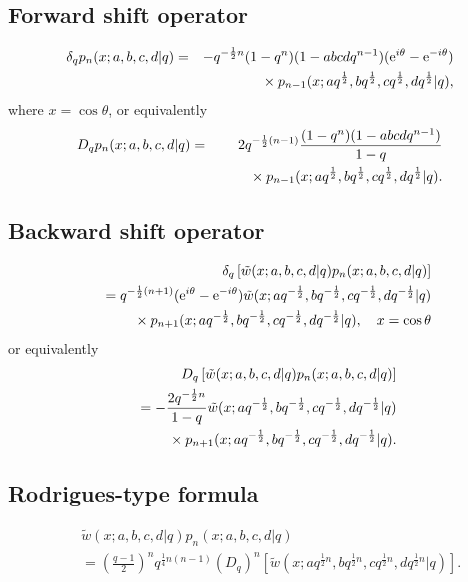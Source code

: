 \documentclass[envcountchap,graybox]{svmono}
\newcommand{\mathindent}{\hspace{7.5mm}}
\newcommand{\e}{\textrm{e}}
\begin{document}
\subsection*{Forward shift operator}
\begin{eqnarray}
\label{shift1AskeyWilsonI}
\delta_q p_n(x;a,b,c,d|q)&=&-q^{-\frac{1}{2}n}(1-q^n)(1-abcdq^{n-1})(\e^{i\theta}-\e^{-i\theta})\nonumber\\
& &{}\mathindent{}\times p_{n-1}(x;aq^{\frac{1}{2}},bq^{\frac{1}{2}},cq^{\frac{1}{2}},dq^{\frac{1}{2}}|q),
\end{eqnarray}
where $x=\cos\theta$, or equivalently
\begin{eqnarray}
\label{shift1AskeyWilsonII}
D_q p_n(x;a,b,c,d|q)&=&2q^{-\frac{1}{2}(n-1)}\frac{(1-q^n)(1-abcdq^{n-1})}{1-q}\nonumber\\
& &{}\mathindent\times p_{n-1}(x;aq^{\frac{1}{2}},bq^{\frac{1}{2}},cq^{\frac{1}{2}},dq^{\frac{1}{2}}|q).
\end{eqnarray}

\subsection*{Backward shift operator}
\begin{eqnarray}
\label{shift2AskeyWilsonI}
& &\delta_q\left[{\tilde w}(x;a,b,c,d|q)p_n(x;a,b,c,d|q)\right]\nonumber\\
& &{}=q^{-\frac{1}{2}(n+1)}(\e^{i\theta}-\e^{-i\theta}){\tilde w}(x;aq^{-\frac{1}{2}},bq^{-\frac{1}{2}},cq^{-\frac{1}{2}},dq^{-\frac{1}{2}}|q)\nonumber\\
& &{}\mathindent{}\times p_{n+1}(x;aq^{-\frac{1}{2}},bq^{-\frac{1}{2}},cq^{-\frac{1}{2}},dq^{-\frac{1}{2}}|q),
\quad x=\cos\theta
\end{eqnarray}
or equivalently
\begin{eqnarray}
\label{shift2AskeyWilsonII}
& &D_q\left[{\tilde w}(x;a,b,c,d|q)p_n(x;a,b,c,d|q)\right]\nonumber\\
& &{}=-\frac{2q^{-\frac{1}{2}n}}{1-q}{\tilde w}(x;aq^{-\frac{1}{2}},bq^{-\frac{1}{2}},cq^{-\frac{1}{2}},dq^{-\frac{1}{2}}|q)\nonumber\\
& &{}\mathindent{}\times p_{n+1}(x;aq^{-\frac{1}{2}},bq^{-\frac{1}{2}},cq^{-\frac{1}{2}},dq^{-\frac{1}{2}}|q).
\end{eqnarray}

\newpage

\subsection*{Rodrigues-type formula}
\begin{eqnarray}
\label{RodAskeyWilson}
& &{\tilde w}(x;a,b,c,d|q)p_n(x;a,b,c,d|q)\nonumber\\
& &{}=\left(\frac{q-1}{2}\right)^nq^{\frac{1}{4}n(n-1)}\left(D_q\right)^n
\left[{\tilde w}(x;aq^{\frac{1}{2}n},bq^{\frac{1}{2}n},cq^{\frac{1}{2}n},dq^{\frac{1}{2}n}|q)\right].
\end{eqnarray}
\end{document}
